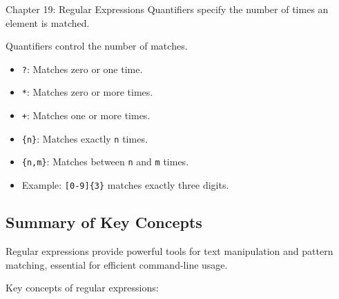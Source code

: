 \begin{notes}{Chapter 19: Regular Expressions}
    Quantifiers specify the number of times an element is matched.
    
    \begin{highlight}[Quantifiers]
    
    Quantifiers control the number of matches.
    
    \begin{itemize}
        \item \texttt{?}: Matches zero or one time.
        \item \texttt{*}: Matches zero or more times.
        \item \texttt{+}: Matches one or more times.
        \item \texttt{\{n\}}: Matches exactly \texttt{n} times.
        \item \texttt{\{n,m\}}: Matches between \texttt{n} and \texttt{m} times.
        \item Example: \texttt{[0-9]\{3\}} matches exactly three digits.
    \end{itemize}
    
    \end{highlight}
    
    \subsection*{Summary of Key Concepts}
    
    Regular expressions provide powerful tools for text manipulation and pattern matching, essential for efficient command-line usage.
    
    \begin{highlight}
    
    Key concepts of regular expressions:
    

\end{highlight}
\end{notes}
